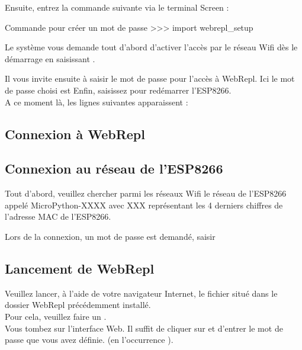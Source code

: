 Ensuite, entrez la commande suivante via le terminal Screen :
\begin{Bash}{Commande pour créer un mot de passe}
>>> import webrepl_setup
\end{Bash}

Le système vous demande tout d'abord d’activer l’accès par le réseau Wifi dès le démarrage en saisissant .


Il vous invite ensuite à saisir le mot de passe pour l'accès à WebRepl. Ici le mot de passe choisi est 
Enfin, saisissez  pour redémarrer l'ESP8266.\\
A ce moment là, les lignes suivantes apparaissent : 



\subsection{Connexion à WebRepl}



\subsection{Connexion au réseau de l'ESP8266}

Tout d'abord, veuillez chercher parmi les réseaux Wifi le réseau de l'ESP8266 appelé MicroPython-XXXX avec XXX représentant les 4 derniers chiffres de l'adresse MAC de l'ESP8266.

Lors de la connexion, un mot de passe est demandé, saisir 

\subsection{Lancement de WebRepl}

 Veuillez lancer, à l'aide de votre navigateur Internet, le fichier   situé dans le dossier WebRepl précédemment installé. \\
 Pour cela, veuillez faire un . \\
Vous tombez sur l’interface Web. Il suffit de cliquer sur  et d’entrer le mot de passe que vous avez définie.
(en l'occurrence ).


